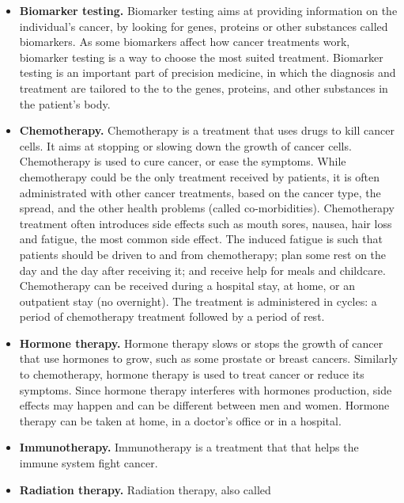 \begin{itemize}
    \item \textbf{Biomarker testing.} Biomarker testing aims at providing
          information on the individual's cancer, by looking for genes, proteins or
          other substances called biomarkers. As some biomarkers affect how cancer
          treatments work, biomarker testing is a way to choose the most suited
          treatment. Biomarker testing is an important part of precision medicine, in
          which the diagnosis and treatment are tailored to the to the genes,
          proteins, and other substances in the patient's body.
    \item \textbf{Chemotherapy.} Chemotherapy is a treatment that uses drugs to
          kill cancer cells. It aims at stopping or slowing down the growth of
          cancer cells. Chemotherapy is used to cure cancer, or ease the
          symptoms. While chemotherapy could be the only treatment received by
          patients, it is often administrated with other cancer treatments,
          based on the cancer type, the spread, and the other health problems
          (called co-morbidities). Chemotherapy treatment often introduces side
          effects such as mouth sores, nausea, hair loss and fatigue, the most
          common side effect. The induced fatigue is such that patients should
          be driven to and from chemotherapy; plan some rest on the day and the
          day after receiving it; and receive help for meals and childcare.
          Chemotherapy can be received during a hospital stay, at home, or an
          outpatient stay (no overnight). The treatment is administered in
          cycles: a period of chemotherapy treatment followed by a period of
          rest.
    \item \textbf{Hormone therapy.} Hormone therapy slows or stops the growth of
          cancer that use hormones to grow, such as some prostate or breast
          cancers. Similarly to chemotherapy, hormone therapy is used to treat
          cancer or reduce its symptoms. Since hormone therapy interferes
          with hormones production, side effects may happen and can be
          different between men and women. Hormone therapy can be taken at
          home, in a doctor's office or in a hospital.
    \item \textbf{Immunotherapy.} Immunotherapy is a treatment that that helps
          the immune system fight cancer. %
    \item \textbf{Radiation therapy.} Radiation therapy, also called

\end{itemize}
